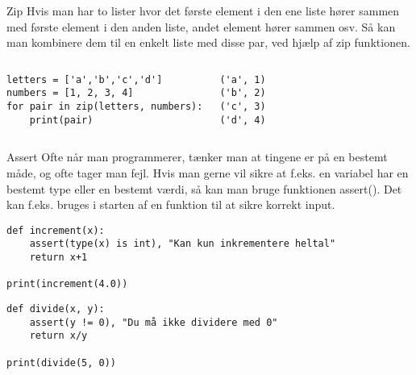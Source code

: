 \begin{frame}[fragile]{Zip}
	Hvis man har to lister hvor det første element i den ene liste hører sammen med første element i den anden liste, andet element hører sammen osv. Så kan man kombinere dem til en enkelt liste med disse par, ved hjælp af zip funktionen.
	\begin{columns}
		\begin{lstlisting}[style=python]
letters = ['a','b','c','d']
numbers = [1, 2, 3, 4]
for pair in zip(letters, numbers):
	print(pair)
		\end{lstlisting}
		
		\pause
		\begin{lstlisting}[style=python]
('a', 1)
('b', 2)
('c', 3)
('d', 4)
		\end{lstlisting}
	\end{columns}
\end{frame}

\begin{frame}[fragile]{Assert}
	Ofte når man programmerer, tænker man at tingene er på en bestemt måde, og ofte tager man fejl. Hvis man gerne vil sikre at f.eks. en variabel har en bestemt type eller en bestemt værdi, så kan man bruge funktionen assert(). Det kan f.eks. bruges i starten af en funktion til at sikre korrekt input.
	\begin{lstlisting}[style=python]
def increment(x):
	assert(type(x) is int), "Kan kun inkrementere heltal"
	return x+1

print(increment(4.0))
	\end{lstlisting}
	
	\begin{lstlisting}[style=python]
def divide(x, y):
	assert(y != 0), "Du må ikke dividere med 0"
	return x/y

print(divide(5, 0))
	\end{lstlisting}
\end{frame}

